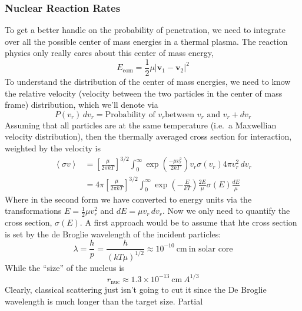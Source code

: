 \documentclass[10pt]{article}
\numberwithin{equation}{section}
\newcommand{\n}{\noindent}
\newcommand{\norm}[1]{\left\lvert#1\right\rvert}
\newcommand{\avg}[1]{\left\langle#1\right\rangle}
\begin{document}
  \subsubsection{Nuclear Reaction Rates}
  \label{sec:nucl-react-rates}
	\n To get a better handle on the probability of penetration, we need to
integrate over all the possible center of mass energies in a thermal plasma.
The reaction physics only really cares about this center of mass energy,
	\begin{equation}
		E_{\mathrm{com}} = \frac{1}{2}\mu \norm{\mathbf{v}_1 - \mathbf{v}_2}^2
	\end{equation}
	To understand the distribution of the center of mass energies, we need to
know the relative velocity (velocity between the two particles in the center of
mass frame) distribution, which we'll denote via
	\begin{equation}
		\label{eq:vel_prob:1} P(v_r)\,dv_r = \textrm{Probability of }v_r\textrm{
		between } v_r \textrm{ and } v_r+dv_r
	\end{equation}
	Assuming that all particles are at the same temperature (i.e.\ a Maxwellian
velocity distribution), then the thermally averaged cross section for
interaction, weighted by the velocity is
	\begin{align}
		\avg{\sigma v} &= \left[\frac{\mu}{2\pi kT}\right]^{3/2} \int_0^\infty \exp
		\left(\frac{-\mu v_r^2}{2kT}\right) v_r \sigma(v_r) 4\pi v_r^2\, dv_r\\
		&= 4\pi \left[\frac{\mu}{2\pi kT}\right]^{3/2} \int_0^\infty \exp
		\left(-\frac{E}{kT}\right) \frac{2E}{\mu} \sigma(E) \frac{dE}{\mu}
	\end{align}
	Where in the second form we have converted to energy units via the
transformations $E=\frac{1}{2}\mu v_r^2$ and $dE = \mu v_r\, dv_r$. Now we only
need to quantify the cross section, $\sigma(E)$. A first approach would be to assume that hte cross section is set by the de Broglie wavelength of the incident particles:
  \begin{equation}
    \label{eq:121}
    \lambda = \frac{h}{p}=\frac{h}{\left(kT\mu\right)^{1/2}}\approx
    10^{-10}\ \mathrm{cm}\ \textrm{in solar core}
  \end{equation}
  While the ``size'' of the nucleus is
  \begin{equation}
    \label{eq:122}
    r_{\mathrm{nuc}}\approx 1.3\times 10^{-13}\ \mathrm{cm}\ A^{1/3}
  \end{equation}
  Clearly, classical scattering just isn't going to cut it since the
  De Broglie wavelength is much longer than the target size. Partial
\end{document}
